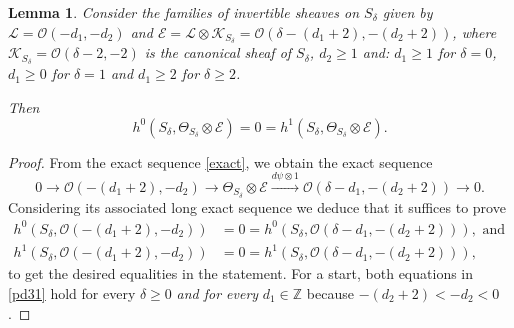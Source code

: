\documentclass{amsart} %
\newtheorem{lemma}[theorem]{Lemma}
\theoremstyle{definition}
\newcommand{\cs}{S_{\delta}}
\newcommand{\ZZ}{\mathbb{Z}}
\newcommand{\mcL}{\mathcal{L}}
\newcommand{\mcO}{\mathcal{O}}
\newcommand{\mcK}{\mathcal{K}}
\newcommand{\mcE}{\mathcal{E}}
\begin{document}
\begin{lemma}\label{Lemma 3}
Consider the families of invertible sheaves on $ S_{\delta} $ given by
 $ \mcL = \mcO( -d_1, -d_2 ) $ and $ \mcE = \mcL \otimes \mcK_{\cs} = \mcO( \delta -(d_1 + 2), -(d_2 + 2) ) $,
 where $ \mcK_{\cs} = \mcO(\delta-2,-2) $ is the canonical sheaf of $ \cs $,
 $ d_2 \geq 1 $ and:
 $ d_1 \geq 1 $ for $ \delta = 0 $,
 $ d_1 \geq 0 $ for $ \delta = 1 $ and
 $ d_1 \geq 2 $ for $ \delta \geq 2 $.

 Then
 \[
  h^0(S_{\delta}, \Theta_{S_{\delta}}\otimes \mcE) = 0 = h^1(S_{\delta}, \Theta_{S_{\delta}}\otimes \mcE).
 \]

\end{lemma}
\begin{proof}
From the exact sequence \eqref{exact}, we obtain the exact sequence
  \begin{equation*} %
0\rightarrow \mcO( -(d_1+2), -d_2) \rightarrow
 \Theta_{S_{\delta}}\otimes \mcE\xrightarrow{d\psi\otimes 1} \mcO(\delta-d_1,-(d_2+2)) \rightarrow 0.
\end{equation*}
Considering its associated long exact sequence we deduce that it suffices to prove
 \begin{align}\label{pd31}
   h^0(S_{\delta},\mcO( -(d_1+2), -d_2) ) & = 0 = h^0(S_{\delta},\mcO(\delta-d_1,-(d_2+2))), \text{ and } \\ \label{pd32}
   h^1(S_{\delta},\mcO( -(d_1+2), -d_2) ) & = 0 = h^1(S_{\delta},\mcO(\delta-d_1,-(d_2+2))),
 \end{align}
 to get the desired equalities in the statement. For a start, both equations in \eqref{pd31} hold
 for every $ \delta \geq 0 $ \textit{and for every } $ d_1 \in \ZZ $
 because $ -(d_2+2) < -d_2 < 0 $.


\end{proof}
\end{document}
